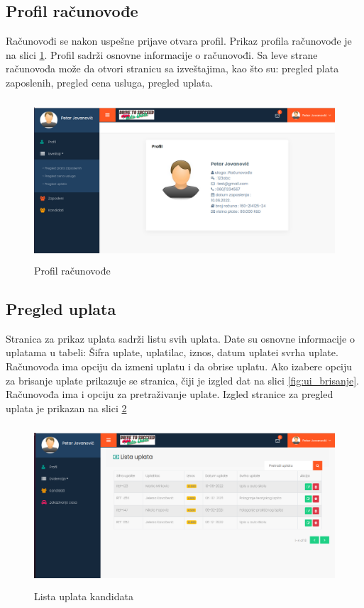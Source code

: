 \subsection{Profil računovođe}

Računovođi se nakon uspešne prijave otvara profil. Prikaz profila računovođe je na slici \ref{fig:profilR}. Profil sadrži osnovne informacije o računovođi. Sa leve strane računovođa može da otvori stranicu sa izveštajima, kao što su: pregled plata zaposlenih, pregled cena usluga, pregled uplata. 

\begin{figure}[H]
  \begin{center}
      \includegraphics[width=140mm, height=60mm]{UI/UI_profil_racunovodja.png}
  \end{center}
  \caption {Profil računovođe}
  \label{fig:profilR}

\end{figure}

\subsection{Pregled uplata}

Stranica za prikaz uplata sadrži listu svih uplata. Date su osnovne informacije o uplatama u tabeli: Šifra uplate, uplatilac, iznos, datum uplatei svrha uplate.  Računovođa ima opciju da izmeni uplatu i da obrise uplatu. Ako izabere opciju za brisanje uplate prikazuje se stranica, čiji je izgled dat na slici \ref{fig:ui_brisanje}. Računovođa ima i opciju za pretraživanje uplate. Izgled stranice za pregled uplata je prikazan na slici 
\ref{fig:ui_uplate}

\begin{figure}[H]
  \begin{center}
      \includegraphics[width=140mm, height=60mm]{UI/UI_lista_uplata.png}
  \end{center}
  \caption {Lista uplata kandidata}
  \label{fig:ui_uplate}

\end{figure}



